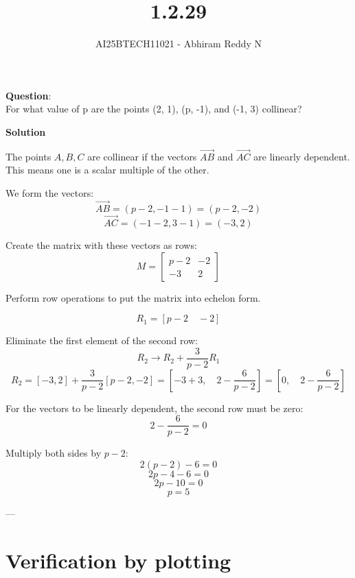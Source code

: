 \documentclass[journal]{IEEEtran}
\begin{document}

\vspace{3cm}

\title{1.2.29}
\author{AI25BTECH11021 - Abhiram Reddy N}
{\let\newpage\relax\maketitle}

\renewcommand{\thefigure}{\theenumi}
\renewcommand{\thetable}{\theenumi}
\setlength{\intextsep}{10pt} %


\renewcommand{\thetable}{\theenumi}


\textbf{Question}:\\For what value of p are the points (2, 1), (p, -1), and (-1, 3) collinear?


\textbf{Solution}

The points \( A, B, C \) are collinear if the vectors \( \overrightarrow{AB} \) and \( \overrightarrow{AC} \) are linearly dependent. This means one is a scalar multiple of the other.

We form the vectors:
\[
\overrightarrow{AB} = (p - 2, -1 - 1) = (p - 2, -2)
\]
\[
\overrightarrow{AC} = (-1 - 2, 3 - 1) = (-3, 2)
\]

Create the matrix with these vectors as rows:
\[
M = \begin{bmatrix}
p - 2 & -2 \\
-3 & 2
\end{bmatrix}
\]

Perform row operations to put the matrix into echelon form.

\[
R_1 = [p-2 \quad -2]
\]

Eliminate the first element of the second row:
\[
R_2 \to R_2 + \frac{3}{p-2} R_1
\]
\[
R_2 = [-3, 2] + \frac{3}{p-2}[p-2, -2] = [-3 + 3, \quad 2 - \frac{6}{p-2}] = [0, \quad 2 - \frac{6}{p-2}]
\]

For the vectors to be linearly dependent, the second row must be zero:
\[
2 - \frac{6}{p-2} = 0
\]

Multiply both sides by \( p - 2 \):
\[
2(p - 2) - 6 = 0
\]
\[
2p - 4 - 6 = 0
\]
\[
2p - 10 = 0
\]
\[
\boxed{p = 5}
\]

---

\section*{Verification by plotting}
\end{document}
